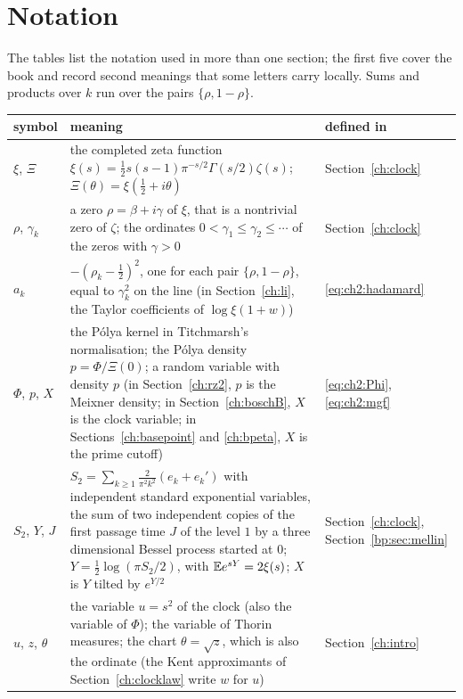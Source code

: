 \chapter{Notation}\label{app:notation}

The tables list the notation used in more than one section; the first five cover the book and record second meanings that some letters carry locally. Sums and products over $k$ run over the pairs $\{\rho,1-\rho\}$.

{\small
\begin{longtable}{@{}p{}p{}p{}@{}}
\toprule
symbol & meaning & defined in\\
\midrule
\endhead
$\xi$, $\Xi$ & \raggedright the completed zeta function ${\xi(s)=\frac12s(s-1)\pi^{-s/2}\Gamma(s/2)\zeta(s)}$; $\Xi(\theta)=\xi(\frac12+i\theta)$ & \raggedright Section~\ref{ch:clock}\tabularnewline
$\rho$, $\gamma_k$ & \raggedright a zero $\rho=\beta+i\gamma$ of $\xi$, that is a nontrivial zero of $\zeta$; the ordinates ${0<\gamma_1\le\gamma_2\le\cdots}$ of the zeros with $\gamma>0$ & \raggedright Section~\ref{ch:clock}\tabularnewline
$a_k$ & \raggedright $-(\rho_k-\frac12)^2$, one for each pair $\{\rho,1-\rho\}$, equal to $\gamma_k^2$ on the line (in Section~\ref{ch:li}, the Taylor coefficients of $\log\xi(1+w)$) & \raggedright \eqref{eq:ch2:hadamard}\tabularnewline
$\Phi$, $p$, $X$ & \raggedright the P\'olya kernel in Titchmarsh's normalisation; the P\'olya density ${p=\Phi/\Xi(0)}$; a random variable with density $p$ (in Section~\ref{ch:rz2}, $p$ is the Meixner density; in Section~\ref{ch:boschB}, $X$ is the clock variable; in Sections~\ref{ch:basepoint} and \ref{ch:bpeta}, $X$ is the prime cutoff) & \raggedright \eqref{eq:ch2:Phi}, \eqref{eq:ch2:mgf}\tabularnewline
$S_2$, $Y$, $J$ & \raggedright ${S_2=\sum_{k\ge1}\frac2{\pi^2k^2}(e_k+e_k')}$ with independent standard exponential variables, the sum of two independent copies of the first passage time $J$ of the level $1$ by a three dimensional Bessel process started at $0$; ${Y=\frac12\log(\pi S_2/2)}$, with ${\mathbb{E} e^{sY}=2\xi(s)}$; $X$ is $Y$ tilted by $e^{Y/2}$ & \raggedright Section~\ref{ch:clock}, Section~\ref{bp:sec:mellin}\tabularnewline
$u$, $z$, $\theta$ & \raggedright the variable $u=s^2$ of the clock (also the variable of $\Phi$); the variable of Thorin measures; the chart $\theta=\sqrt z$, which is also the ordinate (the Kent approximants of Section~\ref{ch:clocklaw} write $w$ for $u$) & \raggedright Section~\ref{ch:intro}\tabularnewline

\end{longtable}}
